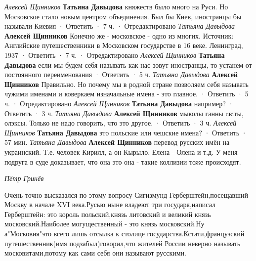 \begin{itemize}
\begin{itemize}
\emph{Алексей Щинников}
\textbf{Татьяна Давыдова} княжеств было много на Руси. Но Московское стало новым центром объединения. Был бы Киев, иностранцы бы называли Киевия
 · Ответить · 7 ч. · Отредактировано
\emph{Татьяна Давыдова}
\textbf{Алексей Щинников} Конечно же - московское - одно из многих. Источник: Английские путешественники в Московском государстве в 16 веке. Ленинград, 1937
 · Ответить · 7 ч. · Отредактировано
\emph{Алексей Щинников}
\textbf{Татьяна Давыдова} если мы будем себя называть как нас зовут иностранцы, то устанем от постоянного переименования
 · Ответить · 5 ч.
\emph{Татьяна Давыдова}
\textbf{Алексей Щинников} Правильно. Но почему мы в родной стране позволяем себя называть чужими именами и коверкаем изначальные имена - это главное.
 · Ответить · 5 ч. · Отредактировано
\emph{Алексей Щинников}
\textbf{Татьяна Давыдова} например?
 · Ответить · 3 ч.
\emph{Татьяна Давыдова}
\textbf{Алексей Щинников} мыколы ганны cвiты, олэксы. Только не надо говорить, что это другое.
 · Ответить · 3 ч.
\emph{Алексей Щинников}
\textbf{Татьяна Давыдова} это польские или чешские имена?
 · Ответить · 57 мин.
\emph{Татьяна Давыдова}
\textbf{Алексей Щинников} перевод русских имён на украинский. Т.е. человек Кирилл, а он Кырыло, Елена - Олена и т.д. У меня подруга в суде доказывает, что она это она - такие коллизии тоже происходят.
\end{itemize}

\emph{Пётр Гринёв}

Очень точно высказался по этому вопросу Сигизмунд Герберштейн,посещавший Москву
в начале XVI века.Русью ныне владеют три государя,написал Герберштейн: это
король польский,князь литовский и великий князь московский.Наиболее
могущественный - это князь московский.Ну а"Московия"это всего лишь отсылка к
столице государства.Кстати,французский путешественник(имя подзабыл)говорил,что
жителей России неверно называть московитами,потому как сами себя они называют
русскими.

\end{itemize}

